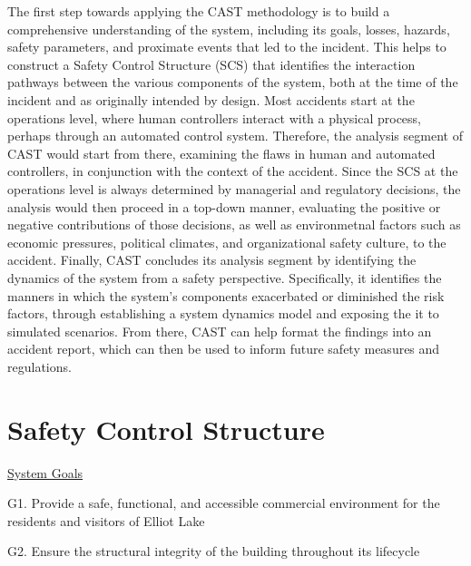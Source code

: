 \documentclass[12pt]{article}
\begin{document}
The first step towards applying the CAST methodology is to build a comprehensive understanding of the system, including its goals, losses, hazards, safety parameters, and proximate events that led to the incident. This helps to construct a Safety Control Structure (SCS) that identifies the interaction pathways between the various components of the system, both at the time of the incident and as originally intended by design. Most accidents start at the operations level, where human controllers interact with a physical process, perhaps through an automated control system. Therefore, the analysis segment of CAST would start from there, examining the flaws in human and automated controllers, in conjunction with the context of the accident. Since the SCS at the operations level is always determined by managerial and regulatory decisions, the analysis would then proceed in a top-down manner, evaluating the positive or negative contributions of those decisions, as well as environmetnal factors such as economic pressures, political climates, and organizational safety culture, to the accident. Finally, CAST concludes its analysis segment by identifying the dynamics of the system from a safety perspective. Specifically, it identifies the manners in which the system's components exacerbated or diminished the risk factors, through establishing a system dynamics model and exposing the it to simulated scenarios. From there, CAST can help format the findings into an accident report, which can then be used to inform future safety measures and regulations.

\section{Safety Control Structure}



\underline{System Goals}

G1. Provide a safe, functional, and accessible commercial environment for the residents and visitors of Elliot Lake

G2. Ensure the structural integrity of the building throughout its lifecycle
\end{document}
